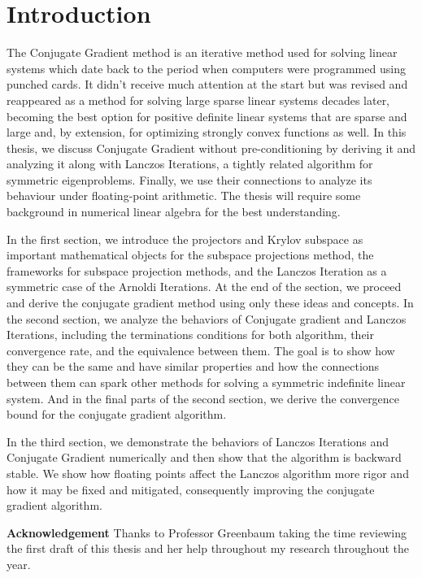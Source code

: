 \documentclass[]{article}
\theoremstyle{definition}
\begin{document}
\section{Introduction}
    The Conjugate Gradient method is an iterative method used for solving linear systems which date back to the period when computers were programmed using punched cards. It didn't receive much attention at the start but was revised and reappeared as a method for solving large sparse linear systems decades later, becoming the best option for positive definite linear systems that are sparse and large and, by extension, for optimizing strongly convex functions as well. In this thesis, we discuss Conjugate Gradient without pre-conditioning by deriving it and analyzing it along with Lanczos Iterations, a tightly related algorithm for symmetric eigenproblems. Finally, we use their connections to analyze its behaviour under floating-point arithmetic. The thesis will require some background in numerical linear algebra for the best understanding. 
    \par
    In the first section, we introduce the projectors and Krylov subspace as important mathematical objects for the subspace projections method, the frameworks for subspace projection methods, and the Lanczos Iteration as a symmetric case of the Arnoldi Iterations. At the end of the section, we proceed and derive the conjugate gradient method using only these ideas and concepts. In the second section, we analyze the behaviors of Conjugate gradient and Lanczos Iterations, including the terminations conditions for both algorithm, their convergence rate, and the equivalence between them. The goal is to show how they can be the same and have similar properties and how the connections between them can spark other methods for solving a symmetric indefinite linear system. And in the final parts of the second section, we derive the convergence bound for the conjugate gradient algorithm. 
    \par
    In the third section, we demonstrate the behaviors of Lanczos Iterations and Conjugate Gradient numerically and then show that the algorithm is backward stable. We show how floating points affect the Lanczos algorithm more rigor and how it may be fixed and mitigated, consequently improving the conjugate gradient algorithm. 

    \newpage
\begin{center}\large
    \textbf{Acknowledgement}
    Thanks to Professor Greenbaum taking the time reviewing the first draft of this thesis and her help throughout my research throughout the year. 
\end{center}
\end{document}
